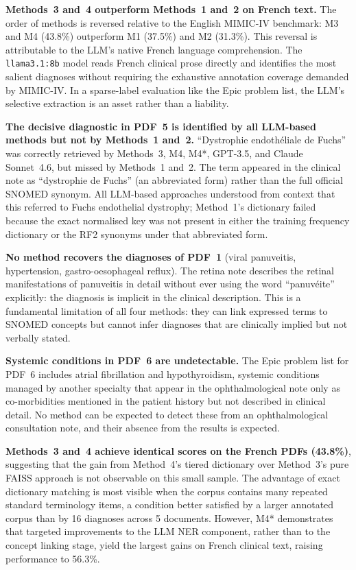 \textbf{Methods~3 and~4 outperform Methods~1 and~2 on French text.} The order of methods is reversed relative to the English MIMIC-IV benchmark: M3 and M4 (43.8\%) outperform M1 (37.5\%) and M2 (31.3\%). This reversal is attributable to the LLM's native French language comprehension. The \texttt{llama3.1:8b} model reads French clinical prose directly and identifies the most salient diagnoses without requiring the exhaustive annotation coverage demanded by MIMIC-IV. In a sparse-label evaluation like the Epic problem list, the LLM's selective extraction is an asset rather than a liability.

\textbf{The decisive diagnostic in PDF~5 is identified by all LLM-based methods but not by Methods~1 and~2.} ``Dystrophie endothéliale de Fuchs'' was correctly retrieved by Methods~3, M4, M4*, GPT-3.5, and Claude Sonnet~4.6, but missed by Methods~1 and~2. The term appeared in the clinical note as ``dystrophie de Fuchs'' (an abbreviated form) rather than the full official SNOMED synonym. All LLM-based approaches understood from context that this referred to Fuchs endothelial dystrophy; Method~1's dictionary failed because the exact normalised key was not present in either the training frequency dictionary or the RF2 synonyms under that abbreviated form.

\textbf{No method recovers the diagnoses of PDF~1} (viral panuveitis, hypertension, gastro-oesophageal reflux). The retina note describes the retinal manifestations of panuveitis in detail without ever using the word ``panuvéite'' explicitly: the diagnosis is implicit in the clinical description. This is a fundamental limitation of all four methods: they can link expressed terms to SNOMED concepts but cannot infer diagnoses that are clinically implied but not verbally stated.

\textbf{Systemic conditions in PDF~6 are undetectable.} The Epic problem list for PDF~6 includes atrial fibrillation and hypothyroidism, systemic conditions managed by another specialty that appear in the ophthalmological note only as co-morbidities mentioned in the patient history but not described in clinical detail. No method can be expected to detect these from an ophthalmological consultation note, and their absence from the results is expected.

\textbf{Methods~3 and~4 achieve identical scores on the French PDFs (43.8\%)}, suggesting that the gain from Method~4's tiered dictionary over Method~3's pure FAISS approach is not observable on this small sample. The advantage of exact dictionary matching is most visible when the corpus contains many repeated standard terminology items, a condition better satisfied by a larger annotated corpus than by 16 diagnoses across 5 documents. However, M4* demonstrates that targeted improvements to the LLM NER component, rather than to the concept linking stage, yield the largest gains on French clinical text, raising performance to 56.3\%.


